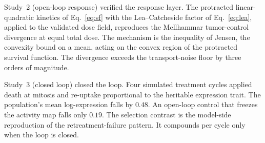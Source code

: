 \documentclass[11pt]{article}
\begin{document}
Study~2 (open-loop response) verified the response layer. The protracted
linear-quadratic kinetics of Eq.~\ref{eq:sf} with the Lea--Catcheside
factor of Eq.~\ref{eq:lea}, applied to the validated dose field, reproduces
the Mellhammar tumor-control divergence at equal total dose. The mechanism
is the inequality of Jensen, the convexity bound on a mean, acting on the
convex region of the protracted survival function. The divergence
exceeds the transport-noise floor by three orders of magnitude.

Study~3 (closed loop) closed the loop. Four simulated treatment cycles
applied death at mitosis and re-uptake proportional to the heritable
expression trait. The population's mean log-expression falls by $0.48$.
An open-loop control that freezes the activity map falls only $0.19$.
The selection contrast is the model-side reproduction of the
retreatment-failure pattern. It compounds per cycle only when the loop
is closed.
\end{document}
